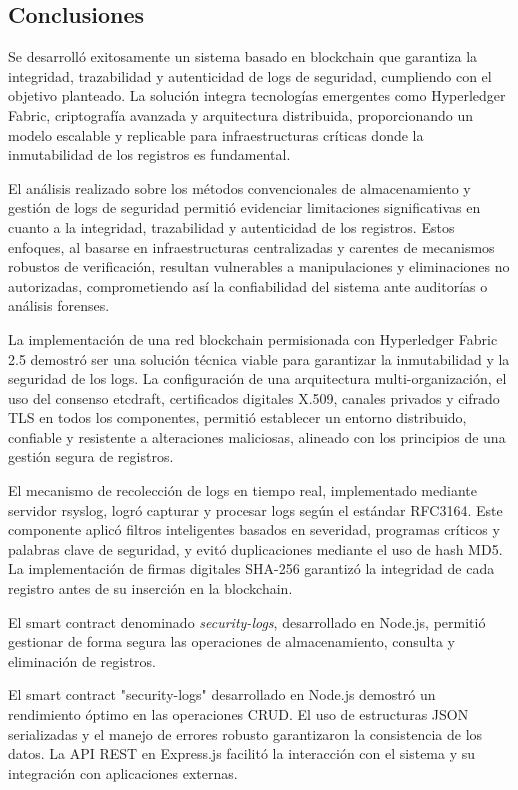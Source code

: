 

\subsection{Conclusiones}

Se desarrolló exitosamente un sistema basado en blockchain que garantiza la integridad, trazabilidad y autenticidad de logs de seguridad, cumpliendo con el objetivo planteado. La solución integra tecnologías emergentes como Hyperledger Fabric, criptografía avanzada y arquitectura distribuida, proporcionando un modelo escalable y replicable para infraestructuras críticas donde la inmutabilidad de los registros es fundamental.

El análisis realizado sobre los métodos convencionales de almacenamiento y gestión de logs de seguridad permitió evidenciar limitaciones significativas en cuanto a la integridad, trazabilidad y autenticidad de los registros. Estos enfoques, al basarse en infraestructuras centralizadas y carentes de mecanismos robustos de verificación, resultan vulnerables a manipulaciones y eliminaciones no autorizadas, comprometiendo así la confiabilidad del sistema ante auditorías o análisis forenses.

La implementación de una red blockchain permisionada con Hyperledger Fabric 2.5 demostró ser una solución técnica viable para garantizar la inmutabilidad y la seguridad de los logs. La configuración de una arquitectura multi-organización, el uso del consenso etcdraft, certificados digitales X.509, canales privados y cifrado TLS en todos los componentes, permitió establecer un entorno distribuido, confiable y resistente a alteraciones maliciosas, alineado con los principios de una gestión segura de registros.

El mecanismo de recolección de logs en tiempo real, implementado mediante servidor rsyslog, logró capturar y procesar logs según el estándar RFC3164. Este componente aplicó filtros inteligentes basados en severidad, programas críticos y palabras clave de seguridad, y evitó duplicaciones mediante el uso de hash MD5.  La implementación de firmas digitales SHA-256 garantizó la integridad de cada registro antes de su inserción en la blockchain.

El smart contract denominado \textit{security-logs}, desarrollado en Node.js, permitió gestionar de forma segura las operaciones de almacenamiento, consulta y eliminación de registros. 

El smart contract "security-logs" desarrollado en Node.js demostró un rendimiento óptimo en las operaciones CRUD. El uso de estructuras JSON serializadas y el manejo de errores robusto garantizaron la consistencia de los datos. La API REST en Express.js facilitó la interacción con el sistema y su integración con aplicaciones externas.

